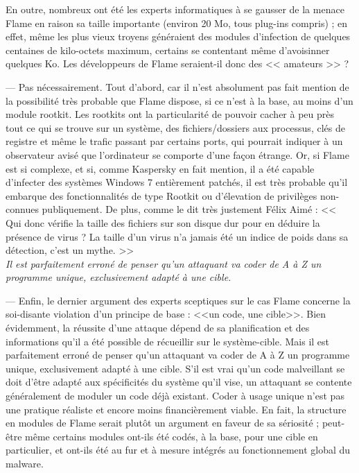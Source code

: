 \documentclass[11pt,twoside,a4paper]{article}
\begin{document}
En outre, nombreux ont {\'e}t{\'e} les experts informatiques {\`a} se gausser de la menace Flame en raison sa taille importante (environ 20 Mo, tous plug-ins compris) ; en effet, m{\^e}me les plus vieux troyens g{\'e}n{\'e}raient des modules d'infection de quelques centaines de kilo-octets maximum, certains se contentant m{\^e}me d'avoisinner quelques Ko. Les d{\'e}veloppeurs de Flame seraient-il donc des << amateurs >> ? %

--- Pas n{\'e}cessairement. Tout d'abord, car il n'est absolument pas fait mention de la possibilit{\'e} tr{\`e}s probable que Flame dispose, si ce n'est {\`a} la base, au moins d'un module rootkit. Les rootkits ont la particularit{\'e} de pouvoir cacher {\`a} peu pr{\`e}s tout ce qui se trouve sur un syst{\`e}me, des fichiers/dossiers aux processus, cl{\'e}s de registre et m{\^e}me le trafic passant par certains ports, qui pourrait indiquer {\`a} un observateur avis{\'e} que l'ordinateur se comporte d'une fa\c{c}on {\'e}trange. Or, si Flame est si complexe, et si, comme Kaspersky en fait mention, il a {\'e}t{\'e} capable d'infecter des syst{\`e}mes Windows 7 enti{\`e}rement patch{\'e}s, il est tr{\`e}s probable qu'il embarque des fonctionnalit{\'e}s de type Rootkit ou d'{\'e}levation de privil{\`e}ges non-connues publiquement. De plus, comme le dit tr{\`e}s justement F{\'e}lix Aim{\'e} : << Qui donc v{\'e}rifie la taille des fichiers sur son disque dur pour en d{\'e}duire la pr{\'e}sence de virus ? La taille d'un virus n'a jamais {\'e}t{\'e} un indice de poids dans sa d{\'e}tection, c'est un mythe. >>~\\

\emph{Il est parfaitement erron{\'e} de penser qu'un attaquant va coder de A {\`a} Z un programme unique, exclusivement adapt{\'e} {\`a} une cible.} %

--- Enfin, le dernier argument des experts sceptiques sur le cas Flame concerne la soi-disante violation d'un principe de base : <<un code, une cible>>. Bien {\'e}videmment, la r{\'e}ussite d'une attaque d{\'e}pend de sa planification et des informations qu'il a {\'e}t{\'e} possible de r{\'e}cueillir sur le syst{\`e}me-cible. Mais il est parfaitement erron{\'e} de penser qu'un attaquant va coder de A {\`a} Z un programme unique, exclusivement adapt{\'e} {\`a} une cible. S'il est vrai qu'un code malveillant se doit d'{\^e}tre adapt{\'e} aux sp{\'e}cificit{\'e}s du syst{\`e}me qu'il vise, un attaquant se contente g{\'e}n{\'e}ralement de moduler un code d{\'e}j{\`a} existant. Coder {\`a} usage unique n'est pas une pratique r{\'e}aliste et encore moins financi{\`e}rement viable. En fait, la structure en modules de Flame serait plut{\^o}t un argument en faveur de sa s{\'e}riosit{\'e} ; peut-{\^e}tre m{\^e}me certains modules ont-ils {\'e}t{\'e} cod{\'e}s, {\`a} la base, pour une cible en particulier, et ont-ils {\'e}t{\'e} au fur et {\`a} mesure int{\'e}gr{\'e}s au fonctionnement global du malware.~\\
\end{document}

